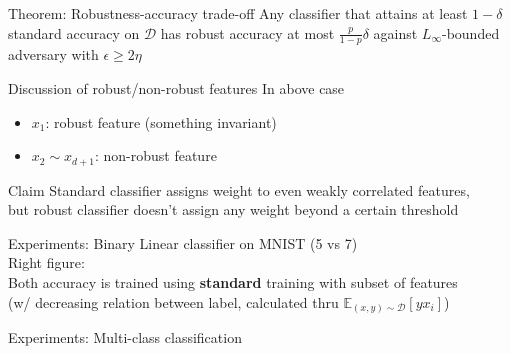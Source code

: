 \documentclass{beamer}
\begin{document}
\begin{frame}{Theorem: Robustness-accuracy trade-off}
  Any classifier that attains at least $1 - \delta$ standard accuracy on $\mathcal{D}$ has robust accuracy at most $\frac{p}{1-p}\delta$ against $L_\infty$-bounded adversary with $\epsilon \geq 2 \eta$
\end{frame}

\begin{frame}{Discussion of robust/non-robust features}
  In above case
  \begin{itemize}
    \item $x_1$: robust feature (something invariant)
    \item $x_2 \sim x_{d+1}$: non-robust feature
  \end{itemize}
  \begin{block}{Claim}
    Standard classifier assigns weight to even weakly correlated features, \\but robust classifier doesn't assign any weight beyond a certain threshold
  \end{block}
\end{frame}

\begin{frame}{Experiments: Binary Linear classifier on MNIST (5 vs 7)}
  \\
  Right figure: \\Both accuracy is trained using \textbf{standard} training with subset of features \\
(w/ decreasing relation between label, calculated thru $\mathbb{E}_{(x,y) \sim \mathcal{D}}[yx_i]$)
\end{frame}


\begin{frame}{Experiments: Multi-class classification}
  \\
\end{frame}
\end{document}
